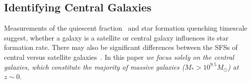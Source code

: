 \documentclass[tighten, preprint]{aastex62}
\begin{document}

\subsection{Identifying Central Galaxies} \label{sec:central}
Measurements of the quiescent fraction~\citep[\emph{e.g.}][]{baldry2006,peng2010,hahn2015}
and star formation quenching timescale~\citep{wetzel2013,hahn2017} 
suggest, whether a galaxy is a satellite or central galaxy influences 
its star formation rate. There may also be significant differences 
between the SFSs of central versus satellite galaxies~\citep{wang2018}. 
In this paper \emph{we focus solely on the central galaxies, which 
constitute the majority of massive galaxies ($M_* > 10^{9.5}M_\odot$) at $z \sim 0$}. 
\end{document}
